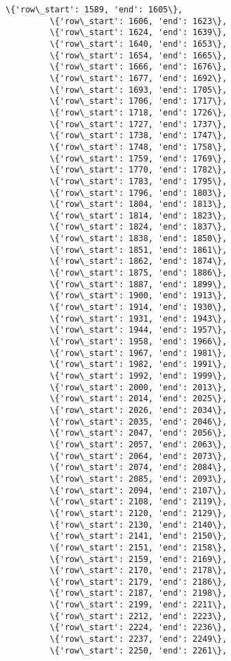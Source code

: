 \documentclass[11pt]{article}
\begin{document}
\begin{Verbatim}[commandchars=\\\{\}]
         \{'row\_start': 1589, 'end': 1605\},
         \{'row\_start': 1606, 'end': 1623\},
         \{'row\_start': 1624, 'end': 1639\},
         \{'row\_start': 1640, 'end': 1653\},
         \{'row\_start': 1654, 'end': 1665\},
         \{'row\_start': 1666, 'end': 1676\},
         \{'row\_start': 1677, 'end': 1692\},
         \{'row\_start': 1693, 'end': 1705\},
         \{'row\_start': 1706, 'end': 1717\},
         \{'row\_start': 1718, 'end': 1726\},
         \{'row\_start': 1727, 'end': 1737\},
         \{'row\_start': 1738, 'end': 1747\},
         \{'row\_start': 1748, 'end': 1758\},
         \{'row\_start': 1759, 'end': 1769\},
         \{'row\_start': 1770, 'end': 1782\},
         \{'row\_start': 1783, 'end': 1795\},
         \{'row\_start': 1796, 'end': 1803\},
         \{'row\_start': 1804, 'end': 1813\},
         \{'row\_start': 1814, 'end': 1823\},
         \{'row\_start': 1824, 'end': 1837\},
         \{'row\_start': 1838, 'end': 1850\},
         \{'row\_start': 1851, 'end': 1861\},
         \{'row\_start': 1862, 'end': 1874\},
         \{'row\_start': 1875, 'end': 1886\},
         \{'row\_start': 1887, 'end': 1899\},
         \{'row\_start': 1900, 'end': 1913\},
         \{'row\_start': 1914, 'end': 1930\},
         \{'row\_start': 1931, 'end': 1943\},
         \{'row\_start': 1944, 'end': 1957\},
         \{'row\_start': 1958, 'end': 1966\},
         \{'row\_start': 1967, 'end': 1981\},
         \{'row\_start': 1982, 'end': 1991\},
         \{'row\_start': 1992, 'end': 1999\},
         \{'row\_start': 2000, 'end': 2013\},
         \{'row\_start': 2014, 'end': 2025\},
         \{'row\_start': 2026, 'end': 2034\},
         \{'row\_start': 2035, 'end': 2046\},
         \{'row\_start': 2047, 'end': 2056\},
         \{'row\_start': 2057, 'end': 2063\},
         \{'row\_start': 2064, 'end': 2073\},
         \{'row\_start': 2074, 'end': 2084\},
         \{'row\_start': 2085, 'end': 2093\},
         \{'row\_start': 2094, 'end': 2107\},
         \{'row\_start': 2108, 'end': 2119\},
         \{'row\_start': 2120, 'end': 2129\},
         \{'row\_start': 2130, 'end': 2140\},
         \{'row\_start': 2141, 'end': 2150\},
         \{'row\_start': 2151, 'end': 2158\},
         \{'row\_start': 2159, 'end': 2169\},
         \{'row\_start': 2170, 'end': 2178\},
         \{'row\_start': 2179, 'end': 2186\},
         \{'row\_start': 2187, 'end': 2198\},
         \{'row\_start': 2199, 'end': 2211\},
         \{'row\_start': 2212, 'end': 2223\},
         \{'row\_start': 2224, 'end': 2236\},
         \{'row\_start': 2237, 'end': 2249\},
         \{'row\_start': 2250, 'end': 2261\},

\end{Verbatim}
\end{document}
